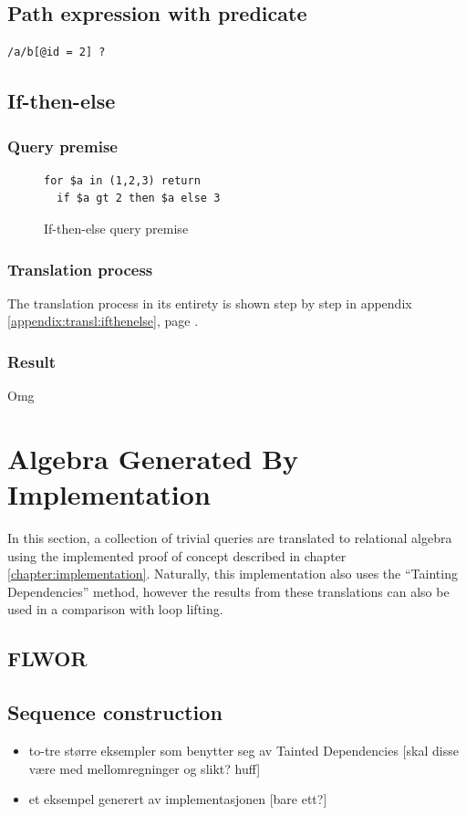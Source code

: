 \subsection{Path expression with predicate}
\begin{Verbatim}
/a/b[@id = 2] ?
\end{Verbatim}

\subsection{If-then-else}
\subsubsection{Query premise}
\begin{figure}[!htp]
\begin{center}
\begin{Verbatim}
for $a in (1,2,3) return
  if $a gt 2 then $a else 3
\end{Verbatim}
  \caption{If-then-else query premise}
  \label{fig:results:query_ifthenelse}
\end{center}
\end{figure}

\subsubsection{Translation process}
The translation process in its entirety is shown step by step in appendix
\ref{appendix:transl:ifthenelse}, page \pageref{appendix:transl:ifthenelse}.

\subsubsection{Result}
Omg


\section{Algebra Generated By Implementation}
In this section, a collection of trivial queries are translated to relational
algebra using the implemented proof of concept described in chapter
\ref{chapter:implementation}. Naturally, this implementation also uses the
``Tainting Dependencies'' method, however the results from these translations
can also be used in a comparison with loop lifting.

\subsection{FLWOR}


\subsection{Sequence construction}

\begin{itemize}
  \item to-tre større eksempler som benytter seg av Tainted Dependencies [skal
  disse v\ae re med mellomregninger og slikt? huff]
  \item et eksempel generert av implementasjonen [bare ett?]
\end{itemize}